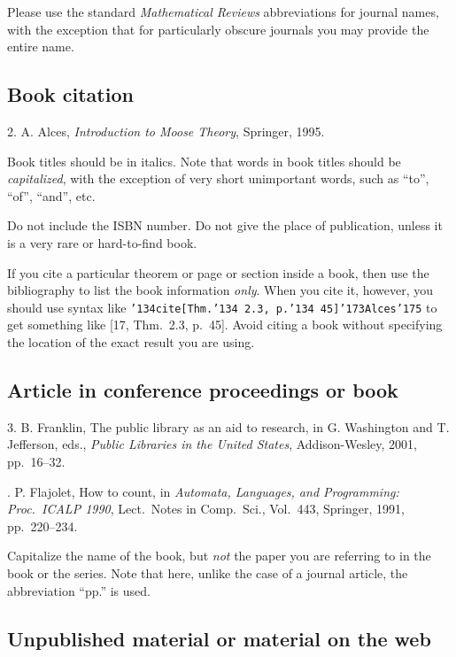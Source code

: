 \documentclass[12pt]{article}
\begin{document}
Please use the standard {\it Mathematical Reviews}
abbreviations for journal names, with the exception that for particularly
obscure journals you may provide the entire name.

\subsection{Book citation}

    2.  A. Alces, {\it Introduction to Moose Theory}, Springer, 1995.

\smallskip

Book titles should be in italics.
Note that words in book titles should be {\it capitalized},
with the exception of
very short unimportant words, such as ``to'', ``of'', ``and'', etc.

Do not include the ISBN number.  Do not give the place
of publication, unless it is a very rare or hard-to-find book.

If you cite a particular theorem or page or section inside a book,
then use the bibliography to list the book information {\it only}.
When you cite it, however, you should use syntax like
{\tt \char'134cite[Thm.{\char'134} 2.3,
p.{\char'134} 45]\char'173Alces\char'175}
to get something like [17, Thm.\ 2.3, p.\ 45].  Avoid citing a book
without specifying the location of the exact result you are using.

\subsection{Article in conference proceedings or book}

    3.  B. Franklin, The public library as an aid to research,
    in G. Washington and T. Jefferson, eds., {\it Public Libraries in
    the United States}, Addison-Wesley, 2001, pp.\ 16--32.

\medskip

.  P. Flajolet, How to count, in {\it Automata, Languages, and
    Programming:  Proc.\ ICALP 1990}, Lect.\ Notes in Comp.\ Sci.,
    Vol.\ 443, Springer, 1991, pp.\ 220--234.

\smallskip

Capitalize the name of the book,
but {\it not\/} the paper you are referring to
in the book or the series.
Note that here, unlike the case of a journal article, the
abbreviation ``pp.'' is used.

\subsection{Unpublished material or material on the web}
\end{document}
